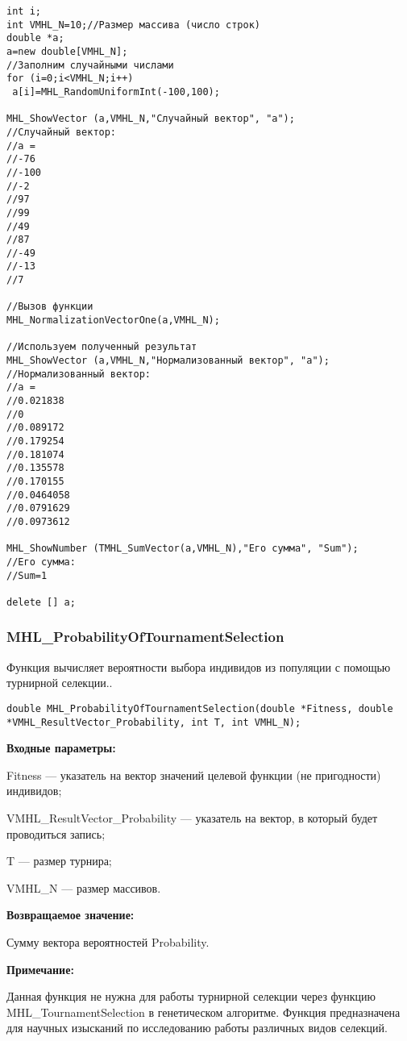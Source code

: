 \documentclass[a4paper,12pt]{article}
\begin{document}
\begin{lstlisting}[label=code_use_MHL_NormalizationVectorOne,caption=Пример использования]
int i;
int VMHL_N=10;//Размер массива (число строк)
double *a;
a=new double[VMHL_N];
//Заполним случайными числами
for (i=0;i<VMHL_N;i++)
 a[i]=MHL_RandomUniformInt(-100,100);

MHL_ShowVector (a,VMHL_N,"Случайный вектор", "a");
//Случайный вектор:
//a =
//-76
//-100
//-2
//97
//99
//49
//87
//-49
//-13
//7

//Вызов функции
MHL_NormalizationVectorOne(a,VMHL_N);

//Используем полученный результат
MHL_ShowVector (a,VMHL_N,"Нормализованный вектор", "a");
//Нормализованный вектор:
//a =
//0.021838
//0
//0.089172
//0.179254
//0.181074
//0.135578
//0.170155
//0.0464058
//0.0791629
//0.0973612

MHL_ShowNumber (TMHL_SumVector(a,VMHL_N),"Его сумма", "Sum");
//Его сумма:
//Sum=1

delete [] a;
\end{lstlisting}

\subsubsection{MHL\_ProbabilityOfTournamentSelection}\label{MHL_ProbabilityOfTournamentSelection}

Функция вычисляет вероятности выбора индивидов из популяции с помощью турнирной селекции..


\begin{lstlisting}[label=code_syntax_MHL_ProbabilityOfTournamentSelection,caption=Синтаксис]
double MHL_ProbabilityOfTournamentSelection(double *Fitness, double *VMHL_ResultVector_Probability, int T, int VMHL_N);
\end{lstlisting}

\textbf{Входные параметры:}  
 
 Fitness --- указатель на вектор значений целевой функции (не пригодности) индивидов;
 
 VMHL\_ResultVector\_Probability --- указатель на вектор, в который будет проводиться запись;
 
 T --- размер турнира;
 
 VMHL\_N ---  размер массивов.

\textbf{Возвращаемое значение:}

 Сумму вектора вероятностей Probability.
 
  \textbf{Примечание:}
  
   Данная функция не нужна для работы турнирной селекции через функцию MHL\_TournamentSelection в генетическом алгоритме. Функция предназначена для научных изысканий по исследованию работы  различных видов селекций.
 
\end{document}
